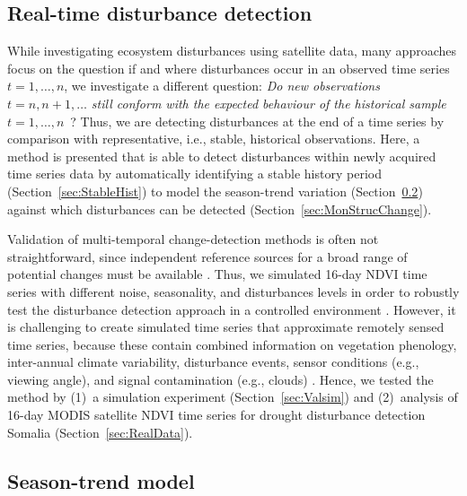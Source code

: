 \documentclass[authoryear,preprint,review,10pt]{elsarticle}
\begin{document}
\subsection{Real-time disturbance detection}\label{sec:Method}

While investigating ecosystem disturbances using satellite data, many approaches \citep[e.g.][]{Verbesselt:2010wo, White2009} focus on the question if and where disturbances occur in an observed time series $t = 1, \dots, n$, we investigate a different question: \emph{Do new observations $t = n, n + 1, \dots$ still conform with the expected behaviour of the historical sample $t = 1, \dots, n$}~? Thus, we are detecting disturbances at the end of a time series by comparison with representative, i.e., stable, historical observations. Here, a method is presented that is able to detect disturbances within newly acquired time series data by automatically identifying a stable history period (Section~\ref{sec:StableHist}) to model the season-trend variation (Section~\ref{sec:seasontrendmodel}) against which disturbances can be detected (Section~\ref{sec:MonStrucChange}).

Validation of multi-temporal change-detection methods is often not straightforward, since independent reference sources for a broad range of potential changes must be available \citep{Kennedy2007}. Thus, we simulated 16-day NDVI time series with different noise, seasonality, and disturbances levels in order to robustly test the disturbance detection approach in a controlled environment \citep{Verbesselt2009a, Verbesselt:2010wo}. However, it is challenging to create simulated time series that approximate remotely sensed time series, because these contain combined information on vegetation phenology, inter-annual climate variability, disturbance events, sensor conditions (e.g., viewing angle), and signal contamination (e.g., clouds) \citep{Zhang2009}. Hence, we tested the method by (1)~a simulation experiment (Section~\ref{sec:Valsim}) and (2)~analysis of 16-day MODIS satellite NDVI time series for drought disturbance detection Somalia (Section~\ref{sec:RealData}). 

\subsection{Season-trend model}\label{sec:seasontrendmodel}
\end{document}
